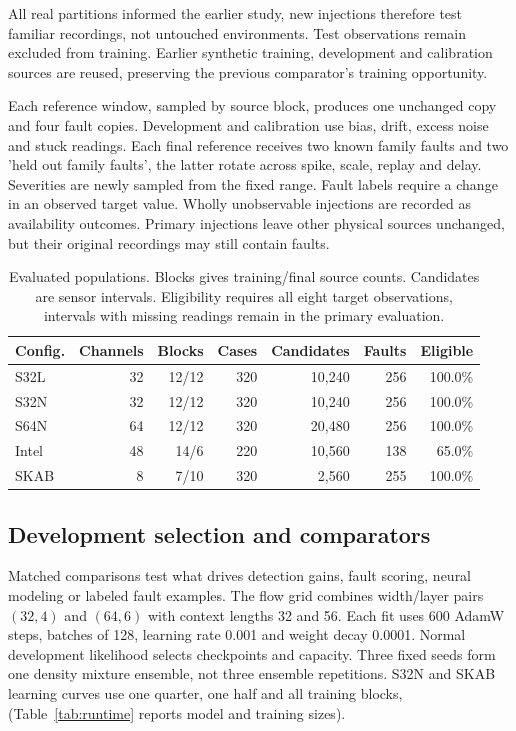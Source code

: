 \documentclass{llncs}
\newcommand{\1}{\mathbf{1}}
\begin{document}
All real partitions informed the earlier study, new injections therefore test familiar recordings, not untouched environments. Test observations remain excluded from training. Earlier synthetic training, development and calibration sources are reused, preserving the previous comparator's training opportunity.

Each reference window, sampled by source block, produces one unchanged copy and four fault copies. Development and calibration use bias, drift, excess noise and stuck readings. Each final reference receives two known family faults and two 'held out family faults', the latter rotate across spike, scale, replay and delay. Severities are newly sampled from the fixed range. Fault labels require a change in an observed target value. Wholly unobservable injections are recorded as availability outcomes. Primary injections leave other physical sources unchanged, but their original recordings may still contain faults.

\begin{table}[!tbp]
\centering
\caption{Evaluated populations. Blocks gives training/final source counts. Candidates are sensor intervals. Eligibility requires all eight target observations, intervals with missing readings remain in the primary evaluation.}
\label{tab:data}
\small
\begin{tabular}{lrrrrrr}
\toprule
Config. & Channels & Blocks & Cases & Candidates & Faults & Eligible \\
\midrule
S32L & 32 & 12/12 & 320 & 10,240 & 256 & 100.0\% \\
S32N & 32 & 12/12 & 320 & 10,240 & 256 & 100.0\% \\
S64N & 64 & 12/12 & 320 & 20,480 & 256 & 100.0\% \\
Intel & 48 & 14/6 & 220 & 10,560 & 138 & 65.0\% \\
SKAB & 8 & 7/10 & 320 & 2,560 & 255 & 100.0\% \\
\bottomrule
\end{tabular}
\end{table}



\subsection{Development selection and comparators}
Matched comparisons test what drives detection gains, fault scoring, neural modeling or labeled fault examples. The flow grid combines width/layer pairs $(32,4)$ and $(64,6)$ with context lengths 32 and 56. Each fit uses 600 AdamW steps, batches of 128, learning rate 0.001 and weight decay 0.0001. Normal development likelihood selects checkpoints and capacity. Three fixed seeds form one density mixture ensemble, not three ensemble repetitions. S32N and SKAB learning curves use one quarter, one half and all training blocks, (Table~\ref{tab:runtime} reports model and training sizes).
\end{document}
